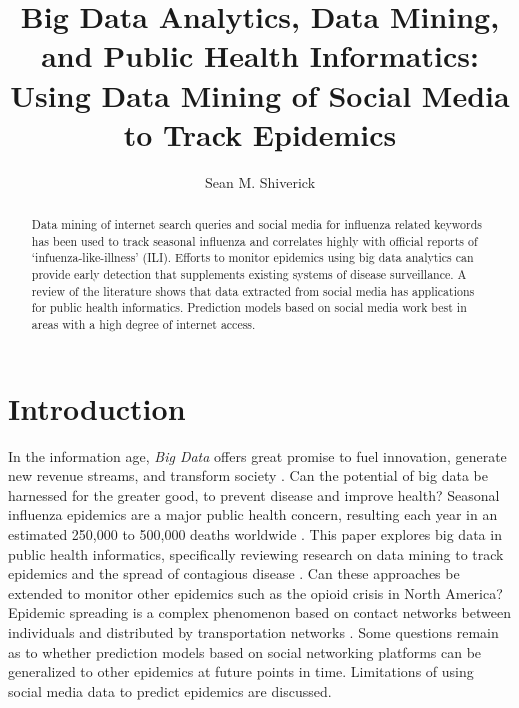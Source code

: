 \documentclass[sigconf]{acmart}
\begin{document}
\title{Big Data Analytics, Data Mining, and Public Health Informatics: 
Using Data Mining of Social Media to Track Epidemics}
\author{Sean M. Shiverick}

\begin{abstract}

Data mining of internet search queries and social media for influenza related keywords 
has been used to track seasonal influenza and correlates highly with official reports 
of `infuenza-like-illness' (ILI). Efforts to monitor epidemics using big data analytics 
can provide early detection that supplements existing systems of disease surveillance. 
A review of the literature shows that data extracted from social media has applications 
for public health informatics. Prediction models based on social media work best in 
areas with a high degree of internet access.  

\end{abstract}


\maketitle

\section{Introduction}

In the information age, \textit{Big Data} offers great promise to fuel innovation, 
generate new revenue streams, and transform society \cite{gupta15}. Can the 
potential of big data be harnessed for the greater good, to prevent disease 
and improve health? Seasonal influenza epidemics are a major public health concern, 
resulting each year in an estimated 250,000 to 500,000 deaths worldwide 
\cite{who16}. This paper explores big data in public health informatics, 
specifically reviewing research on data mining to track epidemics and the spread 
of contagious disease \cite{hay13}. Can these approaches be extended to monitor 
other epidemics such as the opioid crisis in North America? \cite{smith16}
Epidemic spreading is a complex phenomenon based on contact networks between 
individuals and distributed by transportation networks \cite{Colizza06}. Some 
questions remain as to whether prediction models based on social networking 
platforms can be generalized to other epidemics at future points in time. 
Limitations of using social media data to predict epidemics are discussed.
\end{document}
